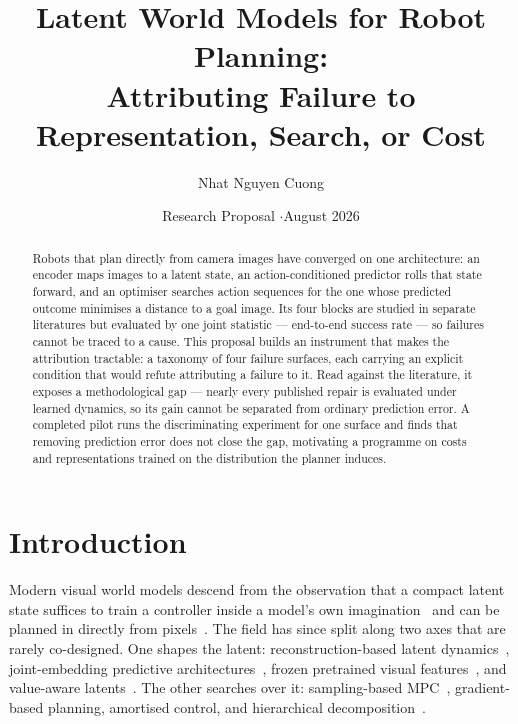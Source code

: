 \documentclass[11pt,letterpaper]{article}
\title{\vspace{-1.2em}\bfseries Latent World Models for Robot Planning:\\
Attributing Failure to Representation, Search, or Cost}
\author{Nhat Nguyen Cuong}
\date{Research Proposal \quad$\cdot$\quad August 2026}
\begin{document}
\maketitle
\vspace{-1.6em}

\begin{abstract}
\noindent\small
Robots that plan directly from camera images have converged on one architecture:
an encoder maps images to a latent state, an action-conditioned predictor rolls
that state forward, and an optimiser searches action sequences for the one whose
predicted outcome minimises a distance to a goal image. Its four blocks are
studied in separate literatures but evaluated by one joint statistic ---
end-to-end success rate --- so failures cannot be traced to a cause. This
proposal builds an instrument that makes the attribution tractable: a taxonomy
of four failure surfaces, each carrying an explicit condition that would refute
attributing a failure to it. Read against the literature, it exposes a
methodological gap --- nearly every published repair is evaluated under learned
dynamics, so its gain cannot be separated from ordinary prediction error. A
completed pilot runs the discriminating experiment for one surface and finds
that removing prediction error does not close the gap, motivating a programme on
costs and representations trained on the distribution the planner induces.
\end{abstract}

\section{Introduction}

Modern visual world models descend from the observation that a compact latent
state suffices to train a controller inside a model's own
imagination~\citep{ha2018worldmodels} and can be planned in directly from
pixels~\citep{hafner2019planet}. The field has since split along two axes that
are rarely co-designed. One shapes the latent: reconstruction-based latent
dynamics~\citep{hafner2025dreamerv3}, joint-embedding predictive
architectures~\citep{lecun2022path,assran2025vjepa2}, frozen pretrained visual
features~\citep{zhou2024dinowm}, and value-aware
latents~\citep{hansen2024tdmpc2}. The other searches over it: sampling-based
MPC~\citep{rubinstein1997cem,williams2017mppi}, gradient-based
planning, amortised control, and hierarchical
decomposition~\citep{zhang2026hwm}.
\end{document}
